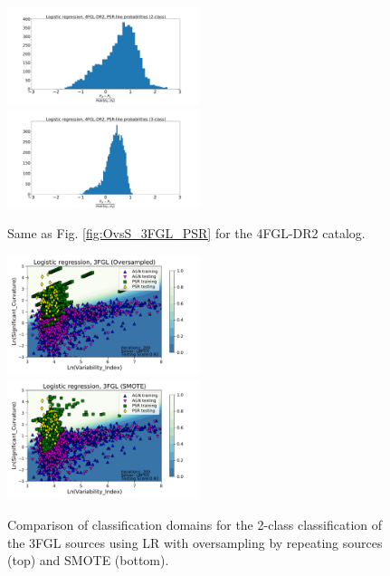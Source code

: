 \documentclass{aa}
\begin{document}
\begin{appendix}
\begin{figure}[h!]
\centering
\includegraphics[width=0.5\textwidth]{plots/hist_diff_smote_LR_4FGL-DR2_2class.pdf}
\includegraphics[width=0.5\textwidth]{plots/hist_diff_smote_LR_4FGL-DR2_3class.pdf}
\caption{Same as Fig. \ref{fig:OvsS_3FGL_PSR} for the 4FGL-DR2 catalog.
}
\label{fig:OvsS_4FGL_PSR}
\end{figure}

\begin{figure}[h!]
\centering
\includegraphics[width=0.5\textwidth]{plots/classification_domains/domains_oversampled_LR_3FGL_2class.pdf}
\includegraphics[width=0.5\textwidth]{plots/classification_domains/domains_smote_LR_3FGL_2class.pdf}
\caption{Comparison of classification domains for the 2-class classification of the 3FGL sources
using LR with oversampling by repeating sources (top) and SMOTE (bottom).
}
\label{fig:domains_smote_over}
\end{figure}


\end{appendix}
\end{document}
